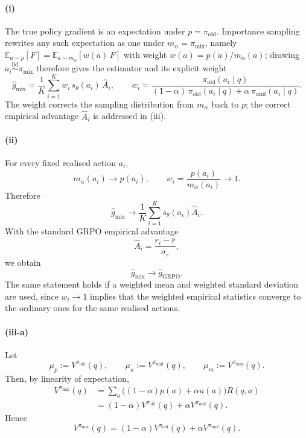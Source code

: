 \documentclass[11pt]{article}
\newcommand{\E}{\mathbb{E}}
\begin{document}
\paragraph{(i)}
The true policy gradient is an expectation under $p=\pi_{\mathrm{old}}$. Importance sampling rewrites any such expectation as one
under $m_\alpha=\pi_{\mathrm{mix}}$, namely $\E_{a\sim p}[F]=\E_{a\sim m_\alpha}[w(a)\,F]$ with weight $w(a)=p(a)/m_\alpha(a)$;
drawing $a_i\overset{\mathrm{iid}}{\sim}\pi_{\mathrm{mix}}$ therefore gives the estimator and its explicit weight
\[
    \widehat g_{\mathrm{mix}}=\frac1K\sum_{i=1}^K w_i\,s_\theta(a_i)\,\widehat A_i,
    \qquad
    w_i=\frac{\pi_{\mathrm{old}}(a_i\mid q)}{(1-\alpha)\,\pi_{\mathrm{old}}(a_i\mid q)+\alpha\,\pi_{\mathrm{unif}}(a_i\mid q)}.
\]
The weight corrects the sampling distribution from $m_\alpha$ back to $p$; the correct empirical advantage $\widehat A_i$ is addressed in (iii).

\paragraph{(ii)}
For every fixed realised action $a_i$,
\[
    m_\alpha(a_i)\to p(a_i),
    \qquad
    w_i=\frac{p(a_i)}{m_\alpha(a_i)}\to1.
\]
Therefore
\[
    \widehat g_{\mathrm{mix}}
    \to
    \frac1K\sum_{i=1}^K s_\theta(a_i)\widehat A_i.
\]
With the standard GRPO empirical advantage
\[
    \widehat A_i=\frac{r_i-\bar r}{\sigma_r},
\]
we obtain
\[
    \widehat g_{\mathrm{mix}}\to \widehat g_{\mathrm{GRPO}}.
\]
The same statement holds if a weighted mean and weighted standard deviation are used, since $w_i\to1$ implies that the weighted empirical statistics converge to the ordinary ones for the same realised actions.

\paragraph{(iii-a)}
Let
\[
    \mu_p:=V^{\pi_{\mathrm{old}}}(q),
    \qquad
    \mu_u:=V^{\pi_{\mathrm{unif}}}(q),
    \qquad
    \mu_m:=V^{\pi_{\mathrm{mix}}}(q).
\]
Then, by linearity of expectation,
\[
\begin{aligned}
    V^{\pi_{\mathrm{mix}}}(q)
    &=
    \sum_a \bigl((1-\alpha)p(a)+\alpha u(a)\bigr)R(q,a) \\
    &=
    (1-\alpha)V^{\pi_{\mathrm{old}}}(q)
    +
    \alpha V^{\pi_{\mathrm{unif}}}(q).
\end{aligned}
\]
Hence
\[
    V^{\pi_{\mathrm{mix}}}(q)
    =
    (1-\alpha)V^{\pi_{\mathrm{old}}}(q)
    +
    \alpha V^{\pi_{\mathrm{unif}}}(q).
\]
\end{document}
